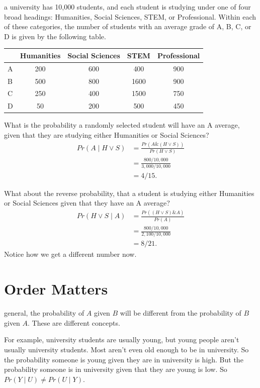 \documentclass[justified]{tufte-book}
\newcommand{\given}{\mid}
\renewcommand{\wedge}{\mathbin{\&}}
\newcommand{\p}{Pr}
\theoremstyle{definition}
\theoremstyle{definition}
\theoremstyle{definition}
\theoremstyle{remark}
\begin{document}
 a university has 10,000 students, and each student is studying under one of four broad headings: Humanities, Social Sciences, STEM, or Professional. Within each of these categories, the number of students with an average grade of A, B, C, or D is given by the following table.
\begin{center}
\begin{tabular}[]{lcccc}
\toprule
& Humanities & Social Sciences & STEM & Professional\tabularnewline
\midrule
A & 200 & 600 & 400 & 900\tabularnewline
B & 500 & 800 & 1600 & 900\tabularnewline
C & 250 & 400 & 1500 & 750\tabularnewline
D & 50 & 200 & 500 & 450\tabularnewline
\bottomrule
\end{tabular}
\end{center}
What is the probability a randomly selected student will have an A average, given that they are studying either Humanities or Social Sciences?
\[
  \begin{aligned}
    \p(A \given H \vee S) &= \frac{\p(A \wedge (H \vee S))}{\p(H \vee S)}\\
                           &= \frac{800/10,000}{3,000/10,000}\\
                           &= 4/15.
  \end{aligned}
\]

What about the reverse probability, that a student is studying either Humanities or Social Sciences given that they have an A average?
\[
  \begin{aligned}
    \p(H \vee S \given A) &= \frac{\p((H \vee S) \wedge A)}{\p(A)}\\
                           &= \frac{800/10,000}{2,100/10,000}\\
                           &= 8/21.
  \end{aligned}
\]
Notice how we get a different number now.

\hypertarget{order-matters}{%
\section{Order Matters}\label{order-matters}}

 general, the probability of \(A\) given \(B\) will be different from the probability of \(B\) given \(A\). These are different concepts.

For example, university students are usually young, but young people aren't usually university students. Most aren't even old enough to be in university. So the probability someone is young given they are in university is high. But the probability someone is in university given that they are young is low. So \(\p(Y \given U) \neq \p(U \given Y)\).
\end{document}
